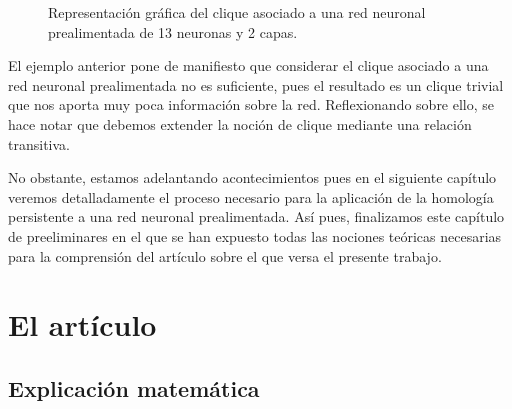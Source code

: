 \documentclass[12pt, a4paper, twoside]{book}
\numberwithin{equation}{section}
\theoremstyle{definition}
\newenvironment{ejem}
  {\pushQED{\qed}\renewcommand{\qedsymbol}{$\blacktriangleleft$}\ejemplo}
  {\popQED\endejemplo}
\theoremstyle{remark}
\theoremstyle{plain}
\begin{document}
\begin{ejem}
\begin{figure}[H]
			\caption{Representación gráfica del clique asociado a una red neuronal prealimentada de 13 neuronas y 2 capas.}
			\label{fig:cliqueEjem}
		\end{figure}
	\end{ejem}

	El ejemplo anterior pone de manifiesto que considerar el clique 
	asociado a una red neuronal prealimentada no es suficiente, pues el 
	resultado es un clique trivial que nos aporta muy poca información 
	sobre la red. Reflexionando sobre ello, se hace notar que debemos 
	extender la noción de clique mediante una relación transitiva. 

	No obstante, estamos adelantando acontecimientos pues en el siguiente 
	capítulo veremos detalladamente el proceso necesario para la 
	aplicación de la homología persistente a una red neuronal 
	prealimentada. Así pues, finalizamos este capítulo de preeliminares en
	el que se han expuesto todas las nociones teóricas necesarias para la 
	comprensión del artículo sobre el que versa el presente trabajo.

	\newpage

	\chapter{El artículo}
	
	\section{Explicación matemática}
\end{document}
